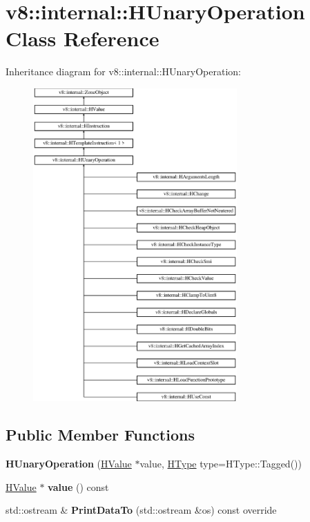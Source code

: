 \hypertarget{classv8_1_1internal_1_1_h_unary_operation}{}\section{v8\+:\+:internal\+:\+:H\+Unary\+Operation Class Reference}
\label{classv8_1_1internal_1_1_h_unary_operation}
Inheritance diagram for v8\+:\+:internal\+:\+:H\+Unary\+Operation\+:\begin{figure}[H]
\begin{center}
\leavevmode
\includegraphics[height=12.000000cm]{classv8_1_1internal_1_1_h_unary_operation}
\end{center}
\end{figure}
\subsection*{Public Member Functions}
\begin{DoxyCompactItemize}
\item 
{\bfseries H\+Unary\+Operation} (\hyperlink{classv8_1_1internal_1_1_h_value}{H\+Value} $\ast$value, \hyperlink{classv8_1_1internal_1_1_h_type}{H\+Type} type=H\+Type\+::\+Tagged())\hypertarget{classv8_1_1internal_1_1_h_unary_operation_a1f6d02f9f6ce99c74d15915ba8b60aa2}{}\label{classv8_1_1internal_1_1_h_unary_operation_a1f6d02f9f6ce99c74d15915ba8b60aa2}

\item 
\hyperlink{classv8_1_1internal_1_1_h_value}{H\+Value} $\ast$ {\bfseries value} () const \hypertarget{classv8_1_1internal_1_1_h_unary_operation_af719639819236af58d79389ba54ec70c}{}\label{classv8_1_1internal_1_1_h_unary_operation_af719639819236af58d79389ba54ec70c}

\item 
std\+::ostream \& {\bfseries Print\+Data\+To} (std\+::ostream \&os) const  override\hypertarget{classv8_1_1internal_1_1_h_unary_operation_a64203fa8f1aa3d708da61b2bf81b81e6}{}\label{classv8_1_1internal_1_1_h_unary_operation_a64203fa8f1aa3d708da61b2bf81b81e6}

\end{DoxyCompactItemize}
